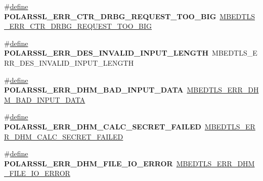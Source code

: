 \begin{DoxyCompactItemize}
\item 
\mbox{\label{compat-1_83_8h_a4ec9724247956f9b2004beb3998cbf4b}} 
\#\hyperlink{structdefine}{define} {\bfseries P\+O\+L\+A\+R\+S\+S\+L\+\_\+\+E\+R\+R\+\_\+\+C\+T\+R\+\_\+\+D\+R\+B\+G\+\_\+\+R\+E\+Q\+U\+E\+S\+T\+\_\+\+T\+O\+O\+\_\+\+B\+IG}~\hyperlink{ctr__drbg_8h_aea1a5c82ce0f69dfdda2d3131bd1b5e1}{M\+B\+E\+D\+T\+L\+S\+\_\+\+E\+R\+R\+\_\+\+C\+T\+R\+\_\+\+D\+R\+B\+G\+\_\+\+R\+E\+Q\+U\+E\+S\+T\+\_\+\+T\+O\+O\+\_\+\+B\+IG}
\item 
\mbox{\label{compat-1_83_8h_abd97773a4916e7ba50ad66dc77719bac}} 
\#\hyperlink{structdefine}{define} {\bfseries P\+O\+L\+A\+R\+S\+S\+L\+\_\+\+E\+R\+R\+\_\+\+D\+E\+S\+\_\+\+I\+N\+V\+A\+L\+I\+D\+\_\+\+I\+N\+P\+U\+T\+\_\+\+L\+E\+N\+G\+TH}~M\+B\+E\+D\+T\+L\+S\+\_\+\+E\+R\+R\+\_\+\+D\+E\+S\+\_\+\+I\+N\+V\+A\+L\+I\+D\+\_\+\+I\+N\+P\+U\+T\+\_\+\+L\+E\+N\+G\+TH
\item 
\mbox{\label{compat-1_83_8h_ab1f102e6347b0cc8c49d525964d7c996}} 
\#\hyperlink{structdefine}{define} {\bfseries P\+O\+L\+A\+R\+S\+S\+L\+\_\+\+E\+R\+R\+\_\+\+D\+H\+M\+\_\+\+B\+A\+D\+\_\+\+I\+N\+P\+U\+T\+\_\+\+D\+A\+TA}~\hyperlink{dhm_8h_aed8709aee853dc12b0ed69980dd05ac9}{M\+B\+E\+D\+T\+L\+S\+\_\+\+E\+R\+R\+\_\+\+D\+H\+M\+\_\+\+B\+A\+D\+\_\+\+I\+N\+P\+U\+T\+\_\+\+D\+A\+TA}
\item 
\mbox{\label{compat-1_83_8h_ab4f6609fa29638c85e6d401954d02845}} 
\#\hyperlink{structdefine}{define} {\bfseries P\+O\+L\+A\+R\+S\+S\+L\+\_\+\+E\+R\+R\+\_\+\+D\+H\+M\+\_\+\+C\+A\+L\+C\+\_\+\+S\+E\+C\+R\+E\+T\+\_\+\+F\+A\+I\+L\+ED}~\hyperlink{dhm_8h_a24f4983888eefb427e2bd10a5fa4e608}{M\+B\+E\+D\+T\+L\+S\+\_\+\+E\+R\+R\+\_\+\+D\+H\+M\+\_\+\+C\+A\+L\+C\+\_\+\+S\+E\+C\+R\+E\+T\+\_\+\+F\+A\+I\+L\+ED}
\item 
\mbox{\label{compat-1_83_8h_aebb6ccd367ebc3306b71fd214530c2c2}} 
\#\hyperlink{structdefine}{define} {\bfseries P\+O\+L\+A\+R\+S\+S\+L\+\_\+\+E\+R\+R\+\_\+\+D\+H\+M\+\_\+\+F\+I\+L\+E\+\_\+\+I\+O\+\_\+\+E\+R\+R\+OR}~\hyperlink{dhm_8h_a9398d77c460671c8fa2a79be8cbf459e}{M\+B\+E\+D\+T\+L\+S\+\_\+\+E\+R\+R\+\_\+\+D\+H\+M\+\_\+\+F\+I\+L\+E\+\_\+\+I\+O\+\_\+\+E\+R\+R\+OR}
\item 
\mbox{\label{compat-1_83_8h_abd146afeae00caff8a5619ae884149db}} 

\end{DoxyCompactItemize}
